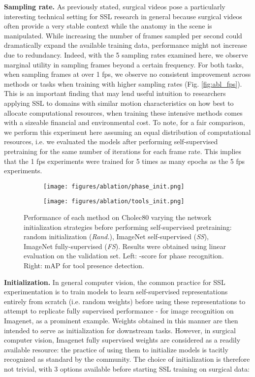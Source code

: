 \documentclass[times,twocolumn,final]{elsarticle}
\begin{document}
\noindent\textbf{Sampling rate. } As previously stated, surgical videos pose a particularly interesting technical setting for SSL research in general because surgical videos often provide a very stable context while the anatomy in the scene is manipulated. While increasing the number of frames sampled per second could dramatically expand the available training data, performance might not increase due to redundancy. Indeed, with the 5 sampling rates examined here, we observe marginal utility in sampling frames beyond a certain frequency. For both tasks, when sampling frames at over 1 fps, we observe no consistent improvement across methods or tasks when training with higher sampling rates (Fig. \ref{fig:abl_fps}). This is an important finding that may lend useful intuition to researchers applying SSL to domains with similar motion characteristics on how best to allocate computational resources, when training these intensive methods comes with a sizeable financial and environmental cost. To note, for a fair comparison, we perform this experiment here assuming an equal distribution of computational resources, i.e. we evaluated the models after performing self-supervised pretraining for the same number of iterations for each frame rate. This implies that the 1 fps experiments were trained for  5 times as many epochs as the 5 fps experiments.
\\
\begin{figure}[h!]
  \begin{subfigure}
    \centering
    \texttt{[image: figures/ablation/phase\_init.png]}
  \end{subfigure}
  \begin{subfigure}
    \centering
    \texttt{[image: figures/ablation/tools\_init.png]} 
  \end{subfigure}
  \caption{Performance of each method on Cholec80 varying the network initialization strategies before performing self-supervised pretraining: random initialization (\textit{Rand.}), ImageNet self-supervised (\textit{SS}), ImageNet fully-supervised (\textit{FS}). Results were obtained using linear evaluation on the validation set. Left: -score for phase recognition. Right: mAP for tool presence detection.}
  \label{fig:abl_init}
\end{figure}
\noindent\textbf{Initialization. } In general computer vision, the common practice for SSL experimentation is to train models to learn self-supervised representations entirely from scratch (i.e. random weights) before using these representations to attempt to replicate fully supervised performance - for image recognition on Imagenet, as a prominent example. Weights obtained in this manner are then intended to serve as initialization for downstream tasks. However, in surgical computer vision, Imagenet fully supervised weights are considered as a readily available resource: the practice of using them to initialize models is tacitly recognized as standard by the community. The choice of initialization is therefore not trivial, with 3 options available before starting SSL training on surgical data:
\end{document}
